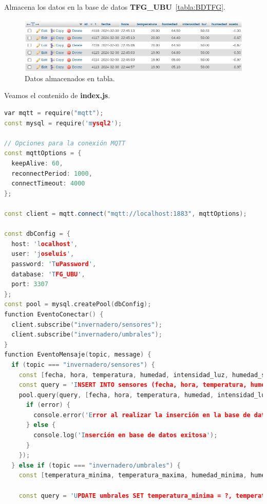 Almacena los datos en la base de datos \textbf{TFG\_UBU}~\ref{tabla:BDTFG}.

\begin{figure}[h]
	\centering
	\includegraphics[width=1\textwidth]{img/desarrollo/mysql_tabla_sensores.png}
	\caption{Datos almacenados en tabla.}
\end{figure}

Veamos el contenido de \textbf{index.js}.

\begin{lstlisting}[language=cpp, firstnumber=0, basicstyle=\normalsize, caption={Contenido de index.js.}] 
var mqtt = require("mqtt");
const mysql = require('mysql2');

// Opciones para la conexión MQTT
const mqttOptions = {
  keepAlive: 60,
  reconnectPeriod: 1000,
  connectTimeout: 4000
};

const client = mqtt.connect("mqtt://localhost:1883", mqttOptions);

const dbConfig = {
  host: 'localhost',
  user: 'joseluis',
  password: 'TuPassword',
  database: 'TFG_UBU',
  port: 3307
};
const pool = mysql.createPool(dbConfig);
function EventoConectar() {
  client.subscribe("invernadero/sensores");
  client.subscribe("invernadero/umbrales");
}
function EventoMensaje(topic, message) {
  if (topic === "invernadero/sensores") {
    const [fecha, hora, temperatura, humedad, intensidad_luz, humedad_suelo] = message.toString().split(',');
    const query = 'INSERT INTO sensores (fecha, hora, temperatura, humedad, intensidad_luz, humedad_suelo) VALUES (?, ?, ?, ?, ?, ?)';
    pool.query(query, [fecha, hora, temperatura, humedad, intensidad_luz, humedad_suelo], (error) => {
      if (error) {
        console.error('Error al realizar la inserción en la base de datos:', error);
      } else {
        console.log('Inserción en base de datos exitosa');
      }
    });
  } else if (topic === "invernadero/umbrales") {
    const [temperatura_minima, temperatura_maxima, humedad_minima, humedad_maxima, luminosidad_minima, luminosidad_maxima, humedad_suelo_minima, humedad_suelo_maxima] = message.toString().split(',');

    const query = 'UPDATE umbrales SET temperatura_minima = ?, temperatura_maxima = ?, humedad_ambiente_minima = ?, humedad_ambiente_maxima = ?, luminosidad_minima = ?, luminosidad_maxima = ?, humedad_suelo_minima = ?, humedad_suelo_maxima = ?';


\end{lstlisting}
